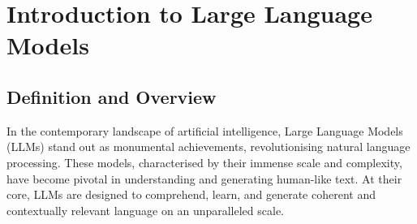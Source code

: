 

\chapter{Introduction to Large Language Models}
\label{ch:introduction}


\section{Definition and Overview}
\label{sec:definition-and-overview}

In the contemporary landscape of artificial intelligence, Large Language Models (LLMs) stand out as monumental achievements, revolutionising natural language processing.
These models, characterised by their immense scale and complexity, have become pivotal in understanding and generating human-like text.
At their core, LLMs are designed to comprehend, learn, and generate coherent and contextually relevant language on an unparalleled scale.

